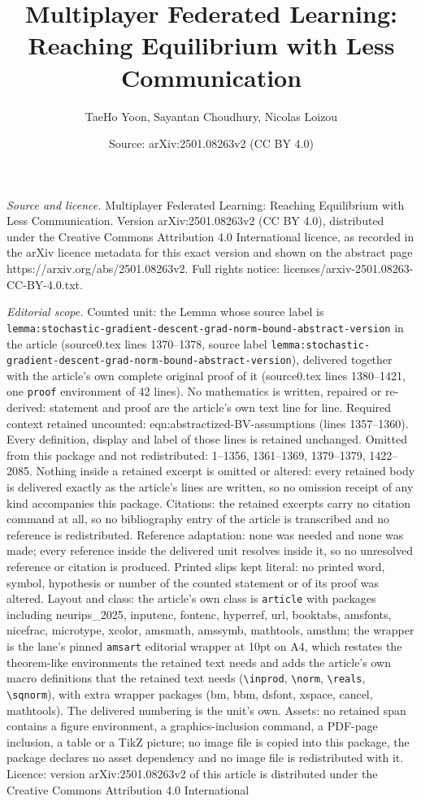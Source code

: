 \documentclass[10pt,a4paper]{amsart}
\title[Multiplayer Federated Learning: Reaching Equilibrium with Le]{Multiplayer Federated Learning: Reaching Equilibrium with Less Communication}
\author{TaeHo Yoon, Sayantan Choudhury, Nicolas Loizou}
\date{Source: arXiv:2501.08263v2 (CC BY 4.0)}
\begin{document}
\maketitle

\noindent\emph{Source and licence.} Multiplayer Federated Learning: Reaching Equilibrium with Less Communication. Version arXiv:2501.08263v2 (CC BY 4.0), distributed under the Creative Commons Attribution 4.0 International licence, as recorded in the arXiv licence metadata for this exact version and shown on the abstract page https://arxiv.org/abs/2501.08263v2. Full rights notice: licenses/arxiv-2501.08263-CC-BY-4.0.txt.\par\smallskip

\noindent\textit{Editorial scope.} Counted unit: the Lemma whose source label is \texttt{lemma:stochastic-gradient-descent-grad-norm-bound-abstract-version} in the article (source0.tex lines 1370--1378, source label \texttt{lemma:stochastic-gradient-descent-grad-norm-bound-abstract-version}), delivered together with the article's own complete original proof of it (source0.tex lines 1380--1421, one \texttt{proof} environment of 42 lines). No mathematics is written, repaired or re-derived: statement and proof are the article's own text line for line. Required context retained uncounted: eqn:abstractized-BV-assumptions (lines 1357--1360). Every definition, display and label of those lines is retained unchanged. Omitted from this package and not redistributed: 1--1356, 1361--1369, 1379--1379, 1422--2085. Nothing inside a retained excerpt is omitted or altered: every retained body is delivered exactly as the article's lines are written, so no omission receipt of any kind accompanies this package. Citations: the retained excerpts carry no citation command at all, so no bibliography entry of the article is transcribed and no reference is redistributed. Reference adaptation: none was needed and none was made; every reference inside the delivered unit resolves inside it, so no unresolved reference or citation is produced. Printed slips kept literal: no printed word, symbol, hypothesis or number of the counted statement or of its proof was altered. Layout and class: the article's own class is \texttt{article} with packages including neurips\_2025, inputenc, fontenc, hyperref, url, booktabs, amsfonts, nicefrac, microtype, xcolor, amsmath, amssymb, mathtools, amsthm; the wrapper is the lane's pinned \texttt{amsart} editorial wrapper at 10pt on A4, which restates the theorem-like environments the retained text needs and adds the article's own macro definitions that the retained text needs (\texttt{\textbackslash inprod}, \texttt{\textbackslash norm}, \texttt{\textbackslash reals}, \texttt{\textbackslash sqnorm}), with extra wrapper packages (bm, bbm, dsfont, xspace, cancel, mathtools). The delivered numbering is the unit's own. Assets: no retained span contains a figure environment, a graphics-inclusion command, a PDF-page inclusion, a table or a TikZ picture; no image file is copied into this package, the package declares no asset dependency and no image file is redistributed with it. Licence: version arXiv:2501.08263v2 of this article is distributed under the Creative Commons Attribution 4.0 International 
\end{document}
